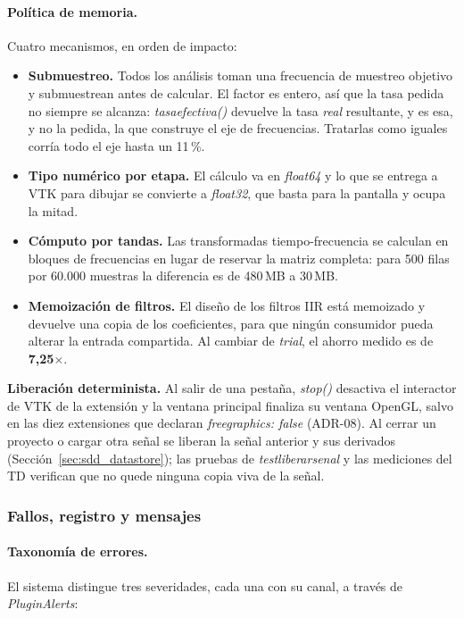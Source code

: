 \documentclass[12pt,letterpaper,oneside]{article}
\DeclareRobustCommand{\_}{\textunderscore\allowbreak}
\begin{document}
\paragraph{Política de memoria.} Cuatro mecanismos, en orden de impacto:

\begin{itemize}
    \item \textbf{Submuestreo.} Todos los análisis toman una frecuencia de muestreo objetivo y submuestrean antes de calcular. El factor es entero, así que la tasa pedida no siempre se alcanza: \textit{tasa\_efectiva()} devuelve la tasa \textit{real} resultante, y es esa, y no la pedida, la que construye el eje de frecuencias. Tratarlas como iguales corría todo el eje hasta un 11\,\%.
    \item \textbf{Tipo numérico por etapa.} El cálculo va en \textit{float64} y lo que se entrega a VTK para dibujar se convierte a \textit{float32}, que basta para la pantalla y ocupa la mitad.
    \item \textbf{Cómputo por tandas.} Las transformadas tiempo-frecuencia se calculan en bloques de frecuencias en lugar de reservar la matriz completa: para 500 filas por 60.000 muestras la diferencia es de 480\,MB a 30\,MB.
    \item \textbf{Memoización de filtros.} El diseño de los filtros IIR está memoizado y devuelve una copia de los coeficientes, para que ningún consumidor pueda alterar la entrada compartida. Al cambiar de \textit{trial}, el ahorro medido es de \textbf{7,25$\times$}.
\end{itemize}

\textbf{Liberación determinista.} Al salir de una pestaña, \textit{stop()} desactiva el interactor de VTK de la extensión y la ventana principal finaliza su ventana OpenGL, salvo en las diez extensiones que declaran \textit{free\_graphics: false} (ADR-08). Al cerrar un proyecto o cargar otra señal se liberan la señal anterior y sus derivados (Sección~\ref{sec:sdd_datastore}); las pruebas de \textit{test\_liberar\_senal} y las mediciones del TD verifican que no quede ninguna copia viva de la señal.

\subsubsection{Fallos, registro y mensajes}

\paragraph{Taxonomía de errores.} El sistema distingue tres severidades, cada una con su canal, a través de \textit{PluginAlerts}:
\end{document}
